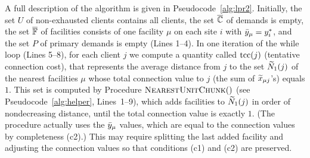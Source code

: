 \documentclass[11pt]{article}
\begin{document}
A full description of the algorithm is given in
Pseudocode~\ref{alg:lpr2}.  Initially, the set $U$ of
non-exhausted clients contains all clients, the set
$\overline{\mathbb{C}}$ of demands is empty, the set $\overline{\mathbb{F}}$ of
facilities consists of one facility $\mu$ on each site $i$
with ${\bar y}_\mu = y^\ast_i$, and the set $P$ of primary
demands is empty (Lines 1--4).  In one iteration of the
while loop (Lines 5--8), for each client $j$ we
compute a quantity called $\textrm{tcc}(j)$ (tentative connection
cost), that represents the average distance from $j$ to the
set ${\widetilde N}_1(j)$ of the nearest facilities $\mu$ whose
total connection value to $j$ (the sum of ${\widetilde x}_{\mu
  j}$'s) equals $1$.  This set is computed by Procedure
${\textsc{NearestUnitChunk}}()$ (see Pseudocode~\ref{alg:helper},
Lines~1--9), which adds facilities to ${\widetilde N}_1(j)$ in
order of nondecreasing distance, until the total connection
value is exactly $1$. (The procedure actually uses the
${\bar y}_\mu$ values, which are equal to the connection values
by completeness (c2).)  This may require splitting the last added
facility and adjusting the connection values so that
conditions (c1) and (c2) are preserved.

\end{document}

